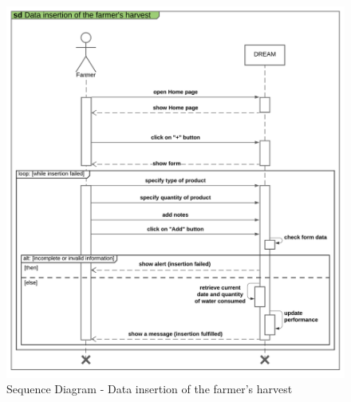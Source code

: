 \begin{center}
    \begin{figure}[H]
  \includegraphics[width=\textwidth,height=\textheight,keepaspectratio]{./Images/Sequence diagram Data insertion of the farmer's harvest.png}
       \vspace*{-0.9cm}
  \caption{Sequence Diagram - Data insertion of the farmer's harvest}
\end{figure}
\end{center}


